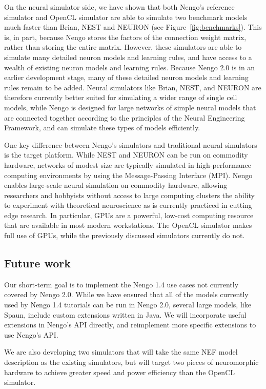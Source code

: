 \documentclass{frontiersSCNS}
\begin{document}
On the neural simulator side,
we have shown that both Nengo's
reference simulator and OpenCL simulator
are able to simulate
two benchmark models much faster
than Brian, NEST and NEURON
(see Figure~\ref{fig:benchmarks}).
This is, in part,
because Nengo stores the factors
of the connection weight matrix,
rather than storing the entire matrix.
However, these simulators are able to simulate
many detailed neuron models
and learning rules,
and have access to
a wealth of existing neuron models
and learning rules.
Because Nengo 2.0 is in an earlier development stage,
many of these detailed neuron models
and learning rules remain to be added.
Neural simulators like Brian, NEST,
and NEURON are therefore currently better suited for
simulating a wider range of single cell models,
while Nengo is designed for large networks
of simple neural models
that are connected together according to
the principles of the Neural Engineering Framework,
and can simulate these types of models efficiently.

One key difference between Nengo's simulators
and traditional neural simulators
is the target platform.
While NEST and NEURON
can be run on commodity hardware,
networks of modest size are
typically simulated in high-performance computing
environments by using
the Message-Passing Interface (MPI).
Nengo enables large-scale neural simulation
on commodity hardware,
allowing researchers and hobbyists
without access to large computing clusters
the ability to experiment with
theoretical neuroscience
as is currently practiced
in cutting edge research.
In particular, GPUs are a
powerful, low-cost computing resource
that are available in most
modern workstations.
The OpenCL simulator makes full use
of GPUs, while the previously discussed simulators
currently do not.

\subsection{Future work}

Our short-term goal
is to implement the Nengo 1.4 use cases
not currently covered by Nengo 2.0.
While we have ensured that all of the models
currently used by Nengo 1.4 tutorials
can be run in Nengo 2.0,
several large models, like Spaun,
include custom extensions written in Java.
We will incorporate useful extensions
in Nengo's API directly,
and reimplement more specific extensions
to use Nengo's API.

We are also developing two simulators
that will take the same NEF model description
as the existing simulators,
but will target two pieces
of neuromorphic hardware
to achieve greater speed and power efficiency
than the OpenCL simulator.
\end{document}
